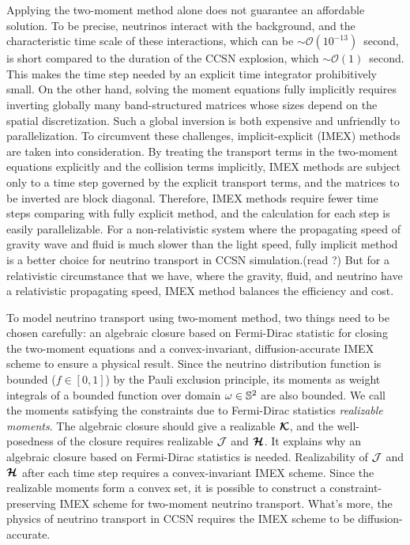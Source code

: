 Applying the two-moment method alone does not guarantee an affordable solution.
To be precise, neutrinos interact with the background, and the characteristic time scale of these interactions, which can be $\sim\mathcal{O}(10^{-13})$~second, is short compared to the duration of the CCSN explosion, which $\sim\mathcal{O}(1)$~second.  
This makes the time step needed by an explicit time integrator prohibitively small. 
On the other hand, solving the moment equations fully implicitly requires inverting globally many band-structured matrices whose sizes depend on the spatial discretization.
Such a global inversion is both expensive and unfriendly to parallelization.
To circumvent these challenges, implicit-explicit (IMEX) methods are taken into consideration.
By treating the transport terms in the two-moment equations explicitly and the collision terms implicitly, IMEX methods are subject only to a time step governed by the explicit transport terms, and the matrices to be inverted are block diagonal.
Therefore, IMEX methods require fewer time steps comparing with fully explicit method, and the calculation for each step is easily parallelizable.  
For a non-relativistic system where the propagating speed of gravity wave and fluid is much slower than the light speed, fully implicit method is a better choice for neutrino transport in CCSN simulation.\cite{cernohorskyVanWeert_1992}(read ?)
But for a relativistic circumstance that we have, where the gravity, fluid, and neutrino have a relativistic propagating speed, IMEX method
balances the efficiency and cost.

To model neutrino transport using two-moment method, two things need to be chosen carefully: an algebraic closure based on Fermi-Dirac statistic for closing the two-moment equations and a convex-invariant, diffusion-accurate IMEX scheme to ensure a physical result.
Since the neutrino distribution function is bounded ($f\in[0,1]$) by the Pauli exclusion principle, its moments as weight integrals of a bounded function over domain $\omega\in\mathbb{S}^{2}$ are also bounded.
We call the moments satisfying the constraints due to Fermi-Dirac statistics \textit{realizable moments}.
The algebraic closure should give a realizable $\boldsymbol{\mathcal{K}}$, and the well-posedness of the closure requires realizable $\mathcal{J}$ and $\boldsymbol{\mathcal{H}}$.
It explains why an algebraic closure based on Fermi-Dirac statistics is needed.
Realizability of $\mathcal{J}$ and $\boldsymbol{\mathcal{H}}$ after each time step requires a convex-invariant IMEX scheme.
Since the realizable moments form a convex set, it is possible to construct a constraint-preserving IMEX scheme for two-moment neutrino transport.
What's more, the physics of neutrino transport in CCSN requires the IMEX scheme to be diffusion-accurate.


